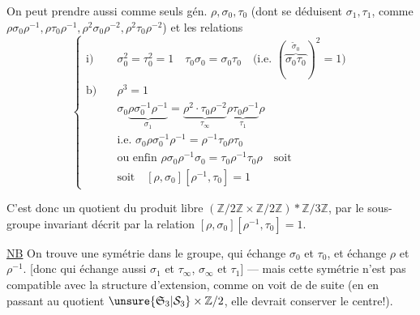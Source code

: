 On peut prendre aussi comme seuls gén. $\rho,\sigma_0,\tau_0$ (dont se déduisent $\sigma_1,\tau_1$, \inserted{$\sigma_\infty,\tau_\infty$,} comme $\rho\sigma_0\rho^{-1},\rho\tau_0\rho^{-1},\rho^2\sigma_0\rho^{-2},\rho^2\tau_0\rho^{-2}$) et les relations
\[
\left\{\begin{aligned}
\text{i)}\quad&\sigma_0^2=\tau_0^2=1\quad\tau_0\sigma_0=\sigma_0\tau_0\quad\text{(i.e. }(\overbrace{\sigma_0\tau_0}^{\tilde\sigma_0})^2=1\text{)}\\
\text{b)}\quad&\rho^3=1\\
&\sigma_0\underbrace{\rho\sigma_0^{-1}\rho^{-1}}_{\sigma_1}=\underbrace{\rho^2\cdot\tau_0\rho^{-2}}_{\tau_\infty}\underbrace{\rho\tau_0\rho^{-1}}_{\tau_1}\rho\\
&\text{i.e. }\sigma_0\rho\sigma_0^{-1}\rho^{-1}=\rho^{-1}\tau_0\rho\tau_0\\
&\text{ou enfin }\rho\sigma_0\rho^{-1}\sigma_0=\tau_0\rho^{-1}\tau_0\rho\quad\text{soit}\\
&\text{soit}\quad[\rho,\sigma_0][\rho^{-1},\tau_0]=1
\end{aligned}\right.
\]

C'est donc un quotient du produit libre $(\mathbb Z/2\mathbb Z\times\mathbb Z/2\mathbb Z)*\mathbb Z/3\mathbb Z$, par le sous-groupe invariant décrit par la relation $[\rho,\sigma_0][\rho^{-1},\tau_0]=1$.

\uline{NB} On trouve une symétrie dans le groupe, qui échange $\sigma_0$ et $\tau_0$, et échange $\rho$ et $\rho^{-1}$. [donc qui échange aussi $\sigma_1$ et $\tau_\infty$, $\sigma_\infty$ et $\tau_1$] --- mais cette symétrie n'est pas compatible avec la structure d'extension, comme on voit de  de suite (en\unsure{:|;} en passant au quotient $\unsure{\mathfrak S_3|\mathcal S_3}\times\mathbb Z/2$, elle devrait conserver le centre!).
